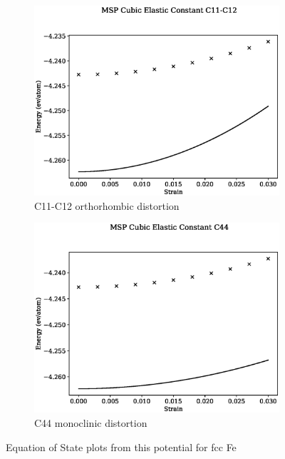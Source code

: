 \begin{figure}[htb]
\begin{subfigure}{.42\textwidth}
  \centering
  \includegraphics[width=.90\linewidth]{chapters/potentials_fe_pd_ru/feru_potential/ec_mskp/msp_c11_c12_plot_bp_1.eps}  
  \caption{C11-C12 orthorhombic distortion}
  \label{fig:feru-fefcc-c11c12}
\end{subfigure}
\begin{subfigure}{.42\textwidth}
  \centering
  \includegraphics[width=.90\linewidth]{chapters/potentials_fe_pd_ru/feru_potential/ec_mskp/msp_c44_plot_bp_1.eps}  
  \caption{C44 monoclinic distortion}
  \label{fig:feru-fefcc-c44}
\end{subfigure}
\label{fig:feru-fefcc-c11c12c44}
\caption{Equation of State plots from this potential for \acrshort{fcc} Fe}
\end{figure}







